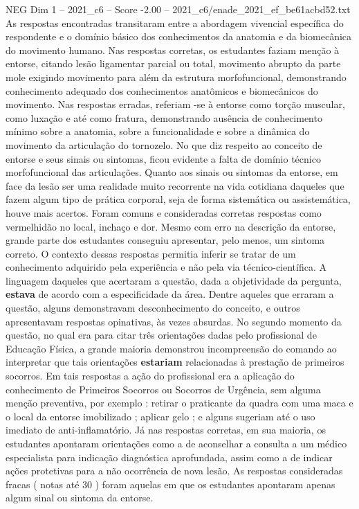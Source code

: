 \begin{textsample}{NEG Dim 1 – 2021\_c6 – Score -2.00 – 2021\_c6/enade\_2021\_ef\_be61acbd52.txt}
As respostas encontradas transitaram entre a abordagem vivencial específica do respondente e o domínio básico dos conhecimentos da anatomia e da biomecânica do movimento humano.
Nas respostas corretas, os estudantes faziam menção à entorse, citando lesão ligamentar parcial ou total, movimento abrupto da parte mole exigindo movimento para além da estrutura morfofuncional, demonstrando conhecimento adequado dos conhecimentos anatômicos e biomecânicos do movimento.
Nas respostas erradas, referiam -se à entorse como torção muscular, como luxação e até como fratura, demonstrando ausência de conhecimento mínimo sobre a anatomia, sobre a funcionalidade e sobre a dinâmica do movimento da articulação do tornozelo.
No que diz respeito ao conceito de entorse e seus sinais ou sintomas, ficou evidente a falta de domínio técnico morfofuncional das articulações.
Quanto aos sinais ou sintomas da entorse, em face da lesão ser uma realidade muito recorrente na vida cotidiana daqueles que fazem algum tipo de prática corporal, seja de forma sistemática ou assistemática, houve mais acertos.
Foram comuns e consideradas corretas respostas como vermelhidão no local, inchaço e dor.
Mesmo com erro na descrição da entorse, grande parte dos estudantes conseguiu apresentar, pelo menos, um sintoma correto.
O contexto dessas respostas permitia inferir se tratar de um conhecimento adquirido pela experiência e não pela via técnico-científica.
A linguagem daqueles que acertaram a questão, dada a objetividade da pergunta, \textbf{estava} de acordo com a especificidade da área.
Dentre aqueles que erraram a questão, alguns demonstravam desconhecimento do conceito, e outros apresentavam respostas opinativas, às vezes absurdas.
No segundo momento da questão, no qual era para citar três orientações dadas pelo profissional de Educação Física, a grande maioria demonstrou incompreensão do comando ao interpretar que tais orientações \textbf{estariam} relacionadas à prestação de primeiros socorros.
Em tais respostas a ação do profissional era a aplicação do conhecimento de Primeiros Socorros ou Socorros de Urgência, sem alguma menção preventiva, por exemplo : retirar o praticante da quadra com uma maca e o local da entorse imobilizado ; aplicar gelo ; e alguns sugeriam até o uso imediato de anti-inflamatório.
Já nas respostas corretas, em sua maioria, os estudantes apontaram orientações como a de aconselhar a consulta a um médico especialista para indicação diagnóstica aprofundada, assim como a de indicar ações protetivas para a não ocorrência de nova lesão.
As respostas consideradas fracas ( notas até 30 ) foram aquelas em que os estudantes apontaram apenas algum sinal ou sintoma da entorse.

\end{textsample}
